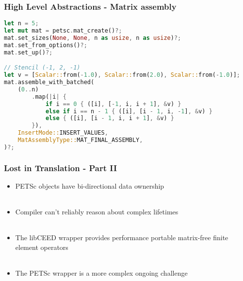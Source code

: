 \documentclass{beamer}
\begin{document}
\begin{frame}[fragile]
\begin{center}
\frametitle{High Level Abstractions - Matrix assembly}

{\footnotesize
\begin{lstlisting}[language=Rust, style=boxedRust]
let n = 5;
let mut mat = petsc.mat_create()?;
mat.set_sizes(None, None, n as usize, n as usize)?;
mat.set_from_options()?;
mat.set_up()?;

// Stencil (-1, 2, -1)
let v = [Scalar::from(-1.0), Scalar::from(2.0), Scalar::from(-1.0)];
mat.assemble_with_batched(
    (0..n)
        .map(|i| {
            if i == 0 { ([i], [-1, i, i + 1], &v) }
            else if i == n - 1 { ([i], [i - 1, i, -1], &v) }
            else { ([i], [i - 1, i, i + 1], &v) }
        }),
    InsertMode::INSERT_VALUES,
    MatAssemblyType::MAT_FINAL_ASSEMBLY,
)?;
\end{lstlisting}
}

\end{center}
\end{frame}


\begin{frame}
\begin{center}
\frametitle{Lost in Translation - Part II}

\begin{itemize}

\item PETSc objects have bi-directional data ownership\\

~\\

\item Compiler can't reliably reason about complex lifetimes\\

~\\

\item The libCEED wrapper provides performance portable matrix-free finite element operators\\

~\\

\item The PETSc wrapper is a more complex ongoing challenge\\

\end{itemize}

\end{center}
\end{frame}
\end{document}
